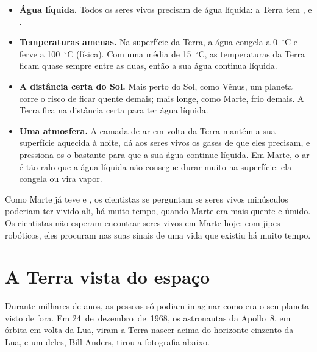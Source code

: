 \begin{itemize}
  \item \textbf{Água líquida.} Todos os seres vivos precisam de água
        líquida: a Terra tem ,  e .
  \item \textbf{Temperaturas amenas.} Na superfície da Terra, a água
        congela a 0~$^\circ$C e ferve a 100~$^\circ$C (física). Com uma
        média de 15~$^\circ$C, as temperaturas da Terra ficam quase sempre
        entre as duas, então a sua água continua líquida.
  \item \textbf{A distância certa do Sol.} Mais perto do Sol, como Vênus,
        um planeta corre o risco de ficar quente demais; mais longe, como
        Marte, frio demais. A Terra fica na distância certa para ter água
        líquida.
  \item \textbf{Uma atmosfera.} A camada de ar em volta da Terra mantém a
        sua superfície aquecida à noite, dá aos seres vivos os gases de que
        eles precisam, e pressiona os  o bastante para que a sua água
        continue líquida. Em Marte, o ar é tão ralo que a água líquida não
        consegue durar muito na superfície: ela congela ou vira vapor.
\end{itemize}

\begin{remark}\label{rem:g6:earth-a-planet:mars-life}
Como Marte já teve  e , os cientistas se perguntam se seres vivos
minúsculos poderiam ter vivido ali, há muito tempo, quando Marte era mais
quente e úmido. Os cientistas não esperam encontrar seres vivos em Marte
hoje; com jipes robóticos, eles procuram nas suas  sinais de uma
vida que existiu há muito tempo.
\end{remark}

\section{A Terra vista do espaço}

Durante milhares de anos, as pessoas só podiam imaginar como era o seu
planeta visto de fora. Em 24~de~dezembro~de~1968, os astronautas da
Apollo~8, em órbita em volta da Lua, viram a Terra nascer acima do
horizonte cinzento da Lua, e um deles, Bill Anders, tirou a fotografia
abaixo.

